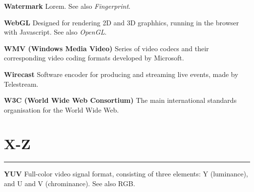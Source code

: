 \smallskip
\textbf{Watermark}
Lorem. See also \textit{Fingerprint}.

\smallskip
\textbf{WebGL}
Designed for rendering 2D and 3D graphhics, running in the browser with Javascript. See also \textit{OpenGL}.

\smallskip
\textbf{WMV (Windows Media Video)}
Series of video codecs and their corresponding video coding formats developed by Microsoft.

\smallskip
\textbf{Wirecast}
Software encoder for producing and streaming live events, made by Telestream.

\smallskip
\textbf{W3C (World Wide Web Consortium)}
The main international standards organisation for the World Wide Web.

\section{X-Z}
\hrule

\medskip
\textbf{YUV}
Full-color video signal format, consisting of three elements: Y (luminance), and U and V (chrominance). See also RGB.
